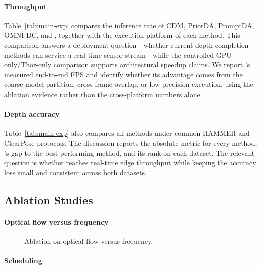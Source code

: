 \paragraph{Throughput}
Table~\ref{tab:main-exp} compares the inference rate of CDM, PriorDA,
PromptDA, OMNI-DC, and \system{}, together with the execution platform of
each method.  This comparison answers a deployment question---whether current
depth-completion methods can service a real-time sensor stream---while the
controlled GPU-only/Thor-only comparison supports architectural speedup
claims.  We report \system{}'s measured end-to-end FPS and identify whether its
advantage comes from the coarse model partition, cross-frame overlap, or
low-precision execution, using the ablation evidence rather than the
cross-platform numbers alone.

\paragraph{Depth accuracy}
Table~\ref{tab:main-exp} also compares all methods under common HAMMER and
ClearPose protocols.  The discussion reports the absolute metric for every
method, \system{}'s gap to the best-performing method, and its rank on each
dataset.  The relevant question is whether \system{} reaches real-time edge
throughput while keeping the accuracy loss small and consistent across both
datasets.

\subsection{Ablation Studies}
\label{sec:ablation}

\paragraph{Optical flow versus frequency}

\begin{figure}[b]
  \centering
  \caption{Ablation on optical flow versus frequency. \pending}
  \label{fig:of-vs-hz}
\end{figure}

\paragraph{Scheduling}

